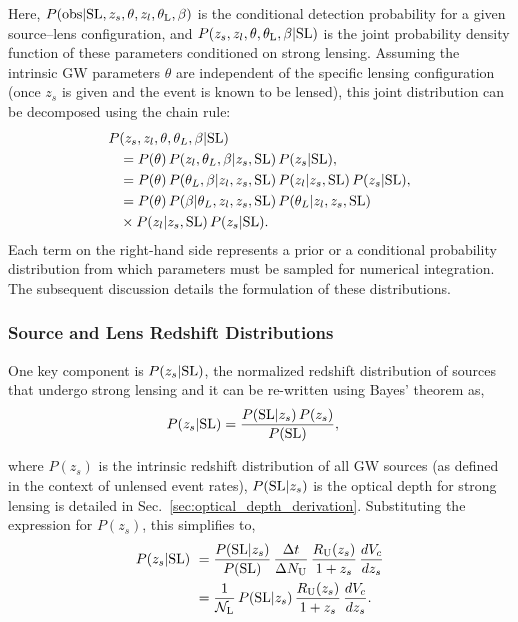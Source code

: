 \documentclass[aps,prd,twocolumn,superscriptaddress,groupedaddress,nofootinbib,showpacs,eqsecnum]{revtex4-1}
\begin{document}
Here, $P({\rm obs}|{\rm SL}, z_s, \theta, z_l, \theta_{\rm L}, \beta)$ is the conditional detection probability for a given source–lens configuration, and $P(z_s, z_l, \theta, \theta_{\rm L}, \beta | {\rm SL})$ is the joint probability density function of these parameters conditioned on strong lensing. Assuming the intrinsic GW parameters $\theta$ are independent of the specific lensing configuration (once $z_s$ is given and the event is known to be lensed), this joint distribution can be decomposed using the chain rule:
\begin{align}
P&(z_s, z_l, \theta, \theta_L, \beta|{\rm SL})\notag \\
&= P(\theta) \, P(z_l, \theta_L, \beta|z_s, {\rm SL}) \, P(z_s|{\rm SL}),\notag \\
&= P(\theta) \, P(\theta_L, \beta|z_l, z_s, {\rm SL})\, P(z_l|z_s, {\rm SL}) \, P(z_s|{\rm SL}),\notag \\
&= P(\theta) \, P(\beta|\theta_L, z_l, z_s, {\rm SL})\, P(\theta_L| z_l, z_s, {\rm SL})\notag \\ 
&\times P(z_l|z_s, {\rm SL}) \, P(z_s|{\rm SL}).
\label{eqn:lensed_event_rate_z_2}
\end{align}
Each term on the right-hand side represents a prior or a conditional probability distribution from which parameters must be sampled for numerical integration. The subsequent discussion details the formulation of these distributions.

\subsubsection{Source and Lens Redshift Distributions}

One key component is $P(z_s|{\rm SL})$, the normalized redshift distribution of sources that undergo strong lensing and it can be re-written using Bayes' theorem as,
\begin{align}
P(z_s | {\rm SL}) &= \frac{P({\rm SL} | z_s) \, P(z_s)}{P({\rm SL})},
\end{align}

where $P(z_s)$ is the intrinsic redshift distribution of all GW sources (as defined in the context of unlensed event rates), $P({\rm SL}|z_s)$ is the optical depth for strong lensing is detailed in Sec.~\ref{sec:optical_depth_derivation}. Substituting the expression for $P(z_s)$, this simplifies to,
\begin{align}
P(z_s | {\rm SL}) 
&= \frac{P({\rm SL}|z_s)}{P({\rm SL})} \, \frac{\Delta t}{\Delta N_{\rm U}} \, \frac{R_{\rm U}(z_s)}{1 + z_s} \, \frac{dV_c}{dz_s} \nonumber \\
&= \frac{1}{{\cal N}_{\rm L}} \, P({\rm SL}|z_s) \, \frac{R_{\rm U}(z_s)}{1 + z_s} \, \frac{dV_c}{dz_s}.
\label{eqn:lensed_event_rate_z_3}
\end{align}
\end{document}
